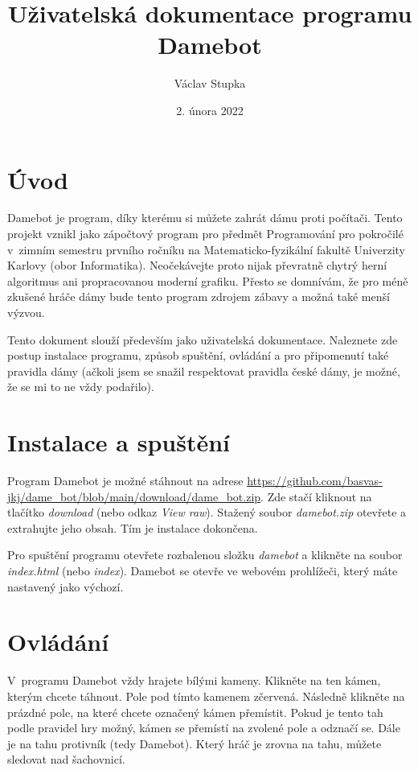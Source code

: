 \documentclass[a4paper,12pt]{article}
\title{Uživatelská dokumentace programu Damebot}
\author{Václav Stupka}
\date{2. února 2022}
\begin{document}
	\maketitle
	\tableofcontents
	
	\section{Úvod}
	Damebot je program, díky kterému si můžete zahrát dámu proti počítači. Tento projekt vznikl jako zápočtový program
	pro předmět Programování pro pokročilé v~zimním semestru prvního ročníku na Matematicko-fyzikální fakultě Univerzity
	Karlovy (obor Informatika). Neočekávejte proto nijak převratně chytrý herní algoritmus ani propracovanou moderní grafiku.
	Přesto se domnívám, že pro méně zkušené hráče dámy bude tento program zdrojem zábavy a možná také menší výzvou.
	
	Tento dokument slouží především jako uživatelská dokumentace. Naleznete zde postup instalace programu, způsob spuštění,
	ovládání a pro připomenutí také pravidla dámy (ačkoli jsem se snažil respektovat pravidla české dámy, je možné, že se
	mi to ne vždy podařilo).
	
	\section{Instalace a spuštění}
	Program Damebot je možné stáhnout na adrese
	\url{https://github.com/basvas-jkj/dame_bot/blob/main/download/dame_bot.zip}.
	Zde stačí kliknout na tlačítko \textit{download} (nebo odkaz \textit{View raw}). Stažený soubor \textit{damebot.zip} otevřete
	a extrahujte jeho obsah. Tím je instalace dokončena.
	
	Pro spuštění programu otevřete rozbalenou složku \textit{damebot} a klikněte na soubor \textit{index.html}
	(nebo \textit{index}). Damebot se otevře ve webovém prohlížeči, který máte nastavený jako výchozí.
	
	\section{Ovládání}
	V~programu Damebot vždy hrajete bílými kameny. Klikněte na ten kámen, kterým chcete táhnout. Pole pod tímto kamenem
	zčervená. Následně klikněte na prázdné pole, na které chcete označený kámen přemístit. Pokud je tento tah podle
	pravidel hry možný, kámen se přemístí na zvolené pole a odznačí se. Dále je na tahu protivník (tedy Damebot). Který
	hráč je zrovna na tahu, můžete sledovat nad šachovnicí.
	
\end{document}
